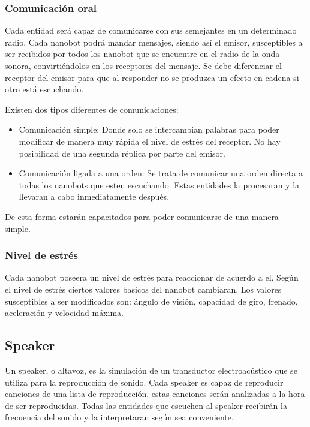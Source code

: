 \subsubsection{Comunicación oral}
\label{sec:comunicacion_oral}

Cada entidad será capaz de comunicarse con sus semejantes en un determinado radio.  Cada nanobot podrá mandar mensajes, siendo así el emisor, susceptibles a ser recibidos por todos los nanobot que se encuentre en el radio de la onda sonora, convirtiéndolos en los receptores del mensaje. Se debe diferenciar el receptor del emisor para que al responder no se produzca un efecto en cadena si otro está escuchando.

Existen dos tipos diferentes de comunicaciones:
\begin{itemize}
 \item Comunicación simple: Donde solo se intercambian palabras para poder modificar de manera muy rápida el nivel de estrés del receptor. No hay posibilidad de una segunda réplica por parte del emisor. 
 \item Comunicación ligada a una orden: Se trata de comunicar una orden directa a todas los nanobots que esten escuchando. Estas entidades la procesaran y la llevaran a cabo inmediatamente después.  
\end{itemize}

De esta forma estarán capacitados para poder comunicarse de una manera simple. 

\subsubsection{Nivel de estrés}
\label{sec:nivel_estres}
Cada nanobot poseera un nivel de estrés para reaccionar de acuerdo a el. Según el nivel de estrés  ciertos valores basicos del nanobot cambiaran. Los valores susceptibles a ser modificados son:  ángulo de visión, capacidad de giro, frenado, aceleración y velocidad máxima. 

\subsection{Speaker}
\label{sec:speaker}
Un speaker, o altavoz, es la simulación de un transductor electroacústico que se utiliza para la reproducción de sonido. Cada speaker es capaz de reproducir canciones de una lista de reproducción, estas canciones serán analizadas a la hora de ser reproducidas. Todas las entidades que escuchen al speaker recibirán la frecuencia del sonido y la interpretaran según sea conveniente.
 
